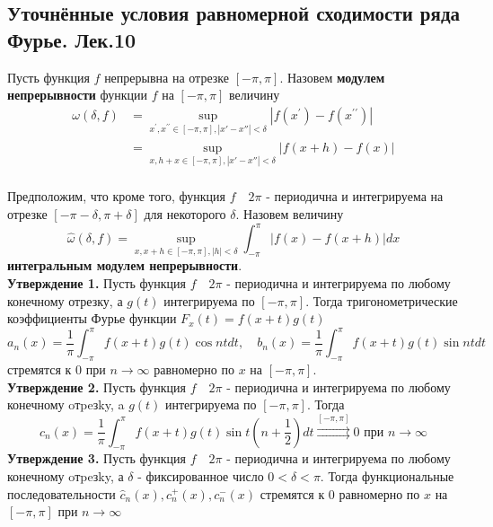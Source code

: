 \documentclass{article}
\begin{document}
\subsection{Уточнённые условия равномерной сходимости ряда Фурье. Лек.10}
	Пусть функция $ f $ непрерывна на отрезке $ [-\pi, \pi]$. Назовем \textbf{модулем непрерывности} функции $ f $ на $ [-\pi, \pi]$ величину
	\begin{equation}
	\begin{aligned}
	\omega(\delta, f)&=\sup _{x^{\prime}, x^{\prime \prime} \in[-\pi,  \pi],|x'-x''|<\delta}\left|f\left(x^{\prime}\right)-f\left(x^{\prime \prime}\right)\right|\\
	&=\sup _{x, h+x \in[-\pi, \pi],|x'-x''|<\delta}|f(x+h)-f(x)|
	\end{aligned}
	\end{equation}
	\\
	Предположим, что кроме того, функция  $ f \quad 2\pi$ - периодична и интегрируема на отрезке $ [-\pi-\delta, \pi+\delta] $ для некоторого $ \delta $. Назовем величину
	\begin{equation}
	\widehat{\omega}(\delta, f)=\sup _{x, x+h \in[-\pi, \pi],|h|<\delta} \int_{-\pi}^{\pi}|f(x)-f(x+h)| d x
	\end{equation}
	\textbf{интегральным модулем непрерывности}.
	\\
	\textbf{Утверждение 1.} Пусть функция $ f \quad 2\pi$ - периодична и интегрируема по любому конечному отрезку, а $ g(t) $ интегрируема по $ [-\pi, \pi] $. Тогда тригонометрические коэффициенты Фурье функции $ F_{x}(t)=f(x+t) g(t)$
	\begin{equation}
	a_{n}(x)=\frac{1}{\pi} \int_{-\pi}^{\pi} f(x+t) g(t) \cos n t d t, \quad b_{n}(x)=\frac{1}{\pi} \int_{-\pi}^{\pi} f(x+t) g(t) \sin n t d t 
	\end{equation}
	стремятся к $0$ при $ n \rightarrow \infty $ равномерно по $ x $ на $ [-\pi, \pi] $.\\
	\textbf{Утверждение 2.} Пусть функция $ f \quad 2\pi$ - периодична и интегрируема по любому конечному oтpeзky, a $ g(t) $ интегрируема по $ [-\pi, \pi] $.  Тогда
	\begin{equation}
	c_{n}(x)=\frac{1}{\pi} \int_{-\pi}^{\pi} f(x+t) g(t) \sin t\left(n+\frac{1}{2}\right) d t \stackrel{[-\pi, \pi]}{\rightrightarrows} 0 \text { при } n \rightarrow \infty
	\end{equation}
	\textbf{Утверждение 3.} Пусть функция $ f \quad 2\pi$ - периодична и интегрируема по любому конечному oтpeзky, а $ \delta $ - фиксированное число $ 0<\delta<\pi $. Тогда функциональные последовательности $ \widehat{c}_{n}(x), c_{n}^{+}(x), c_{n}^{-}(x) $ стремятся к $0$ равномерно по $ x $ на $ [-\pi, \pi] $ при $ n \rightarrow \infty$ 
\end{document}
